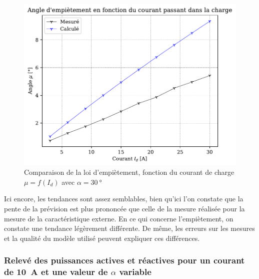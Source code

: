 \documentclass[a4paper, 11pt, openany, oneside, french]{article}
\begin{document}
\begin{figure}[!ht]
    \centering
    \includegraphics[width=0.8\linewidth]{exp1_graph13}
    \caption{Comparaison de la loi d'empiètement, fonction du courant de charge $\mu=f\left(I_d\right)$ avec $\alpha = \SI{30}{\degree}$}
    \label{fig:exp1grap13}
\end{figure}

Ici encore, les tendances sont assez semblables, bien qu'ici l'on constate que la pente de la prévision est plus prononcée que celle de la mesure réalisée pour la mesure de la caractéristique externe. En ce qui concerne l'empiètement, on constate une tendance légèrement différente. De même, les erreurs sur les mesures et la qualité du modèle utilisé peuvent expliquer ces différences.

\clearpage
\subsubsection{Relevé des puissances actives et réactives pour un courant de \SI{10}{\ampere} et une valeur de $\alpha$ variable}
\end{document}
